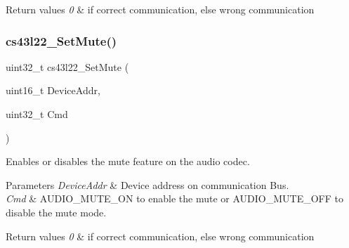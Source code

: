 \begin{DoxyRetVals}{Return values}
{\em 0} & if correct communication, else wrong communication \\
\hline
\end{DoxyRetVals}
\mbox{\label{group___c_s43_l22___private___functions_gaed17c2b64d79830afa43b5a45b159286}} 
\subsubsection{\texorpdfstring{cs43l22\+\_\+\+Set\+Mute()}{cs43l22\_SetMute()}}
{\footnotesize\ttfamily uint32\+\_\+t cs43l22\+\_\+\+Set\+Mute (\begin{DoxyParamCaption}\item[{uint16\+\_\+t}]{Device\+Addr,  }\item[{uint32\+\_\+t}]{Cmd }\end{DoxyParamCaption})}



Enables or disables the mute feature on the audio codec. 


\begin{DoxyParams}{Parameters}
{\em Device\+Addr} & Device address on communication Bus. ~\newline
\\
\hline
{\em Cmd} & A\+U\+D\+I\+O\+\_\+\+M\+U\+T\+E\+\_\+\+ON to enable the mute or A\+U\+D\+I\+O\+\_\+\+M\+U\+T\+E\+\_\+\+O\+FF to disable the mute mode. \\
\hline
\end{DoxyParams}

\begin{DoxyRetVals}{Return values}
{\em 0} & if correct communication, else wrong communication \\
\hline
\end{DoxyRetVals}
\mbox{\label{group___c_s43_l22___private___functions_gaad55b2ed28b599b34f4bfe50df745f0d}} 
